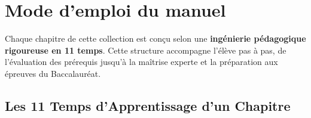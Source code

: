 
\chapter*{Mode d'emploi du manuel}

\begin{tcolorbox}[
  colback=chapcolor!8,
  colframe=chapcolor!80!black,
  arc=4pt,
  boxrule=0.8pt,
  left=12pt, right=12pt, top=10pt, bottom=10pt,
  title={\bfseries\sffamily\Large\strut La Boucle Pédagogique Nexus Réussite en 11 Temps}
]
\sffamily
Chaque chapitre de cette collection est conçu selon une \textbf{ingénierie pédagogique rigoureuse en 11 temps}.
Cette structure accompagne l'élève pas à pas, de l'évaluation des prérequis jusqu'à la maîtrise experte et la préparation aux épreuves du Baccalauréat.
\end{tcolorbox}

\vspace{1em}

\section*{Les 11 Temps d'Apprentissage d'un Chapitre}

